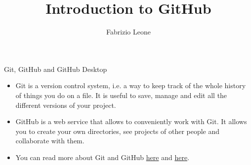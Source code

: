 \documentclass{beamer}
\title{Introduction to GitHub}
\author{Fabrizio Leone}
\begin{document}
\begin{frame}[plain]
    \maketitle
\end{frame}



\begin{frame}{Git, GitHub and GitHub Desktop}

\begin{itemize}\setlength\itemsep{2.5em}
	\item Git is a version control system, i.e. a way to keep track of the whole history of things you do on a file. It is useful to save, manage and edit all the different versions of your project. 
	\item GitHub is a web service that allows to conveniently work with Git. It allows you to create your own directories, see projects of other people and collaborate with them. 
	\item You can read more about Git and GitHub \href{https://medium.com/@abhishekj/an-intro-to-git-and-github-1a0e2c7e3a2f}{here} and \href{https://medium.com/launch-school/understanding-git-and-github-8ac987877a5}{here}.
\end{itemize}	

\end{frame}
\end{document}
